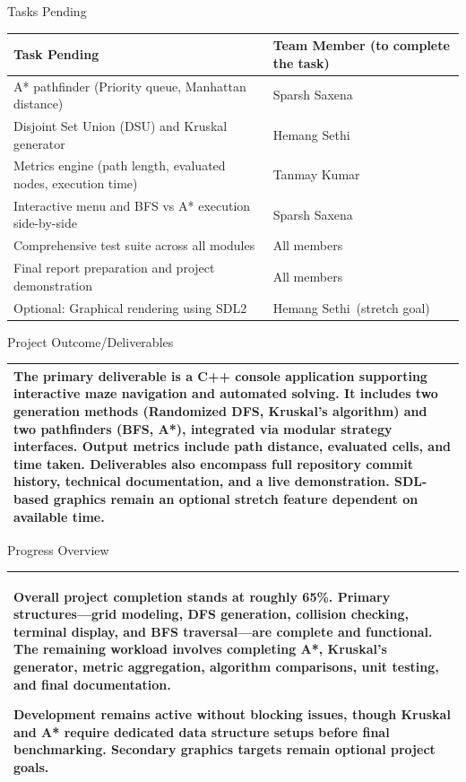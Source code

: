 \documentclass[12pt,a4paper]{article}
\newcommand{\mone}{Tanmay Kumar}
\newcommand{\mtwo}{Sparsh Saxena}
\newcommand{\mthree}{Hemang Sethi}
\newcommand{\secthead}[2]{%
  {\fontsize{18}{21.9}\selectfont\color{geheading}#1\par}\vspace{1.6pt}%
  {\fontsize{10.5}{14.5}\selectfont\color{gehint}#2\par}%
  \vspace{\secgap}}
\newlength{\secgap}\setlength{\secgap}{5.7pt}
\newcommand{\afterbox}{\vspace{\aftergap}}
\newlength{\aftergap}\setlength{\aftergap}{16pt}
\newenvironment{answerbox}{%
  \noindent\begin{tabular}{|p{485.1pt}|}\hline
  \fontsize{11}{13.6}\selectfont\setlength{\parskip}{4pt}\rule{0pt}{22.5pt}\ignorespaces}{%
  \rule[-16pt]{0pt}{0pt}\\\hline\end{tabular}\par}
\newcommand{\tablehead}[1]{\fontsize{12}{14.5}\selectfont\bfseries #1}
\newcommand{\tablebody}{\fontsize{11}{13.6}\selectfont\rule[-5.5pt]{0pt}{19pt}}
\begin{document}
\secthead{Tasks Pending }{}
\noindent\begin{tabularx}{\textwidth}{|X|X|}
\hline
\tablehead{Task Pending} & \tablehead{Team Member (to complete the task)} \\
\hline
\tablebody A* pathfinder (Priority queue, Manhattan distance) & \tablebody \mtwo \\
\hline
\tablebody Disjoint Set Union (DSU) and Kruskal generator & \tablebody \mthree \\
\hline
\tablebody Metrics engine (path length, evaluated nodes, execution time) & \tablebody \mone \\
\hline
\tablebody Interactive menu and BFS vs A* execution side-by-side & \tablebody \mtwo \\
\hline
\tablebody Comprehensive test suite across all modules & \tablebody All members \\
\hline
\tablebody Final report preparation and project demonstration & \tablebody All members \\
\hline
\tablebody Optional: Graphical rendering using SDL2 & \tablebody \mthree \ (stretch goal) \\
\hline
\end{tabularx}

\newpage
\secthead{Project Outcome/Deliverables }{}
\begin{answerbox}
The primary deliverable is a C++ console application supporting interactive maze navigation and automated solving. It includes two generation methods (Randomized DFS, Kruskal's algorithm) and two pathfinders (BFS, A*), integrated via modular strategy interfaces. Output metrics include path distance, evaluated cells, and time taken. Deliverables also encompass full repository commit history, technical documentation, and a live demonstration. SDL-based graphics remain an optional stretch feature dependent on available time.
\end{answerbox}
\afterbox

\secthead{Progress Overview }{}
\begin{answerbox}
Overall project completion stands at roughly 65\%. Primary structures—grid modeling, DFS generation, collision checking, terminal display, and BFS traversal—are complete and functional. The remaining workload involves completing A*, Kruskal's generator, metric aggregation, algorithm comparisons, unit testing, and final documentation.

Development remains active without blocking issues, though Kruskal and A* require dedicated data structure setups before final benchmarking. Secondary graphics targets remain optional project goals.
\end{answerbox}
\end{document}
